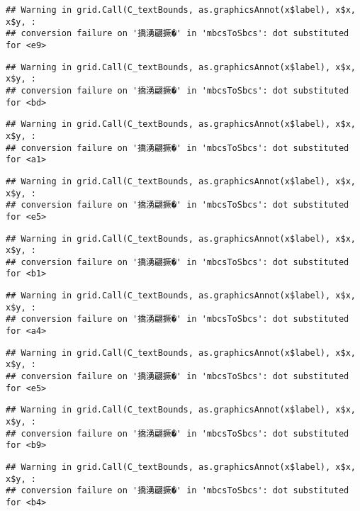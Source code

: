 \documentclass[
]{article}
\begin{document}
\begin{verbatim}
## Warning in grid.Call(C_textBounds, as.graphicsAnnot(x$label), x$x, x$y, :
## conversion failure on '撟湧翩撅�' in 'mbcsToSbcs': dot substituted for <e9>
\end{verbatim}

\begin{verbatim}
## Warning in grid.Call(C_textBounds, as.graphicsAnnot(x$label), x$x, x$y, :
## conversion failure on '撟湧翩撅�' in 'mbcsToSbcs': dot substituted for <bd>
\end{verbatim}

\begin{verbatim}
## Warning in grid.Call(C_textBounds, as.graphicsAnnot(x$label), x$x, x$y, :
## conversion failure on '撟湧翩撅�' in 'mbcsToSbcs': dot substituted for <a1>
\end{verbatim}

\begin{verbatim}
## Warning in grid.Call(C_textBounds, as.graphicsAnnot(x$label), x$x, x$y, :
## conversion failure on '撟湧翩撅�' in 'mbcsToSbcs': dot substituted for <e5>
\end{verbatim}

\begin{verbatim}
## Warning in grid.Call(C_textBounds, as.graphicsAnnot(x$label), x$x, x$y, :
## conversion failure on '撟湧翩撅�' in 'mbcsToSbcs': dot substituted for <b1>
\end{verbatim}

\begin{verbatim}
## Warning in grid.Call(C_textBounds, as.graphicsAnnot(x$label), x$x, x$y, :
## conversion failure on '撟湧翩撅�' in 'mbcsToSbcs': dot substituted for <a4>
\end{verbatim}

\begin{verbatim}
## Warning in grid.Call(C_textBounds, as.graphicsAnnot(x$label), x$x, x$y, :
## conversion failure on '撟湧翩撅�' in 'mbcsToSbcs': dot substituted for <e5>
\end{verbatim}

\begin{verbatim}
## Warning in grid.Call(C_textBounds, as.graphicsAnnot(x$label), x$x, x$y, :
## conversion failure on '撟湧翩撅�' in 'mbcsToSbcs': dot substituted for <b9>
\end{verbatim}

\begin{verbatim}
## Warning in grid.Call(C_textBounds, as.graphicsAnnot(x$label), x$x, x$y, :
## conversion failure on '撟湧翩撅�' in 'mbcsToSbcs': dot substituted for <b4>
\end{verbatim}
\end{document}
